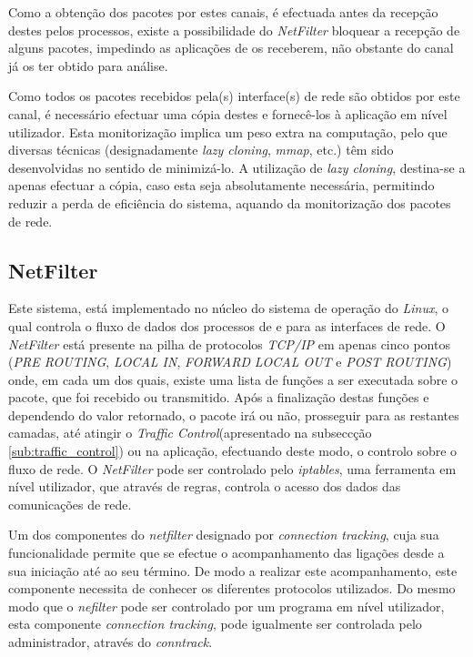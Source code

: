 Como a obtenção dos pacotes por estes canais, é efectuada antes da recepção destes pelos processos, existe a possibilidade do \textit{NetFilter} bloquear a recepção de alguns pacotes, impedindo as aplicações de os receberem, não obstante do canal já os ter obtido para análise.

Como todos os pacotes recebidos pela(s) interface(s) de rede são obtidos por este canal, é necessário efectuar uma cópia destes e fornecê-los à aplicação em nível utilizador.
Esta monitorização implica um peso extra na computação, pelo que diversas técnicas (designadamente \textit{lazy cloning}, \textit{mmap}, etc.) têm sido desenvolvidas no sentido de minimizá-lo.
A utilização de \textit{lazy cloning}, destina-se a apenas efectuar a cópia, caso esta seja absolutamente necessária, permitindo reduzir a perda de eficiência do sistema, aquando da monitorização dos pacotes de rede.




\subsection{NetFilter}

Este sistema, está implementado no núcleo do sistema de operação do \textit{Linux}, o qual controla o fluxo de dados dos processos de e para as interfaces de rede.
O \textit{NetFilter} está presente na pilha de protocolos \textit{TCP/IP} em apenas cinco pontos (\textit{PRE ROUTING}, \textit{LOCAL IN}, \textit{FORWARD} \textit{LOCAL OUT} e \textit{POST ROUTING}) onde, em cada um dos quais, existe uma lista de funções a ser executada sobre o pacote, que foi recebido ou transmitido.
Após a finalização destas funções e dependendo do valor retornado, o pacote irá ou não, prosseguir para as restantes camadas, até atingir o \textit{Traffic Control}(apresentado na subseccção \ref{sub:traffic_control}) ou na aplicação, efectuando deste modo, o controlo sobre o fluxo de rede.
O \textit{NetFilter} pode ser controlado pelo \textit{iptables}, uma ferramenta em nível utilizador, que através de regras, controla o acesso dos dados das comunicações de rede.

Um dos componentes do \textit{netfilter} designado por \textit{connection tracking}, cuja sua funcionalidade permite que se efectue o acompanhamento das ligações desde a sua iniciação até ao seu término.
De modo a realizar este acompanhamento, este componente necessita de conhecer os diferentes protocolos utilizados.
Do mesmo modo que o \textit{nefilter} pode ser controlado por um programa em nível utilizador, esta componente \textit{connection tracking}, pode igualmente ser controlada pelo administrador, através do \textit{conntrack}.

